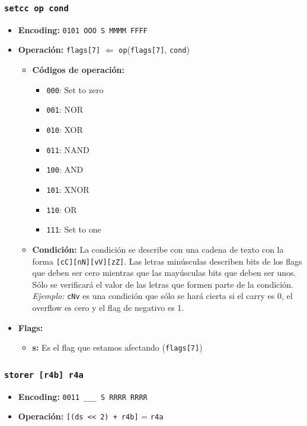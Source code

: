 \documentclass{article}
\begin{document}
\subsubsection{\texttt{setcc op cond}}
\begin{itemize}
    \item \textbf{Encoding:} \texttt{0101 OOO S MMMM FFFF}
    \item \textbf{Operación:} \texttt{flags[7]} $\Leftarrow$ \texttt{op}(\texttt{flags[7]}, \texttt{cond})
        \begin{itemize}
            \item \textbf{Códigos de operación:}
                \begin{itemize}
                    \item \texttt{000}: Set to zero
                    \item \texttt{001}: NOR
                    \item \texttt{010}: XOR
                    \item \texttt{011}: NAND
                    \item \texttt{100}: AND
                    \item \texttt{101}: XNOR
                    \item \texttt{110}: OR
                    \item \texttt{111}: Set to one
                \end{itemize}
            \item \textbf{Condición:} La condición se describe con una cadena de texto con la forma \texttt{[cC][nN][vV][zZ]}. Las letras minúsculas describen bits de los flags que deben ser cero mientras que las mayúsculas bits que deben ser unos. Sólo se verificará el valor de las letras que formen parte de la condición. \emph{Ejemplo:} \texttt{cNv} es una condición que sólo se hará cierta si el carry es 0, el overflow es cero y el flag de
            negativo es 1.
        \end{itemize}
        \item \textbf{Flags:}
        \begin{itemize}
            \item \textbf{s:} Es el flag que estamos afectando (\texttt{flags[7]})
        \end{itemize}
  \end{itemize}
      
\subsubsection{\texttt{storer [r4b] r4a}}
\begin{itemize}
    \item \textbf{Encoding:} \texttt{0011 \_\_\_ S RRRR RRRR}
    \item \textbf{Operación:} \texttt{[(ds << 2) + r4b]} = \texttt{r4a}
\end{itemize}
\end{document}
